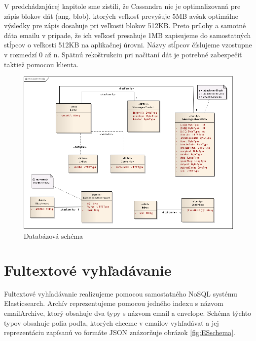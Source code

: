 \documentclass[11pt,twoside,a4paper]{book}
\begin{document}

V predchádzajúcej kapitole sme zistili, že Cassandra nie je optimalizovaná pre zápis blokov dát (ang. blob), ktorých veľkosť prevyšuje 5MB avšak optimálne výsledky pre zápis dosahuje pri veľkosti blokov 512KB. Preto prílohy a samotné dáta emailu v prípade, že ich veľkosť presahuje 1MB zapisujeme do samostatných stĺpcov o veľkosti 512KB na aplikačnej úrovni. Názvy stĺpcov číslujeme vzostupne v rozmedzí 0 až n. Spätnú rekoštrukciu pri načitaní dát je potrebné zabezpečiť taktiež pomocou klienta.

\begin{figure}[h]
 \centering
 \includegraphics[width=17cm]{./figures/cassandra.png}
 \caption{Databázová schéma}
 \label{fig:Cschema}
\end{figure}

\section{Fultextové vyhľadávanie}

Fultextové vyhľadávanie realizujeme pomocou samostatného NoSQL systému Elasticsearch. Archív reprezentujeme pomocou jedného indexu s názvom emailArchive, ktorý obsahuje dva typy s názvom email a envelope. Schéma týchto typov obsahuje polia poďla, ktorých chceme v emailov vyhľadávať a jej reprezentáciu zapísanú vo formáte JSON znázorňuje obrázok \ref{fig:ESschema}.
\end{document}
